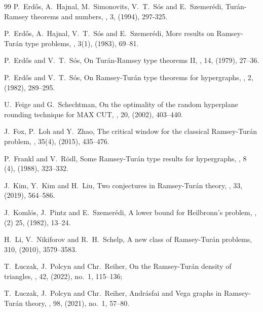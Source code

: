 \begin{thebibliography}{99}
P.~Erd\H os, A.~Hajnal, M.~Simonovits, V.~T.~S\'os and E.~Szemer\'edi,
\newblock Tur\'an-Ramsey theorems and  numbers,
, 3, (1994), 297-325.

P.~Erd\H os, A.~Hajnal, V.~T.~S\'os and E.~Szemer\'edi,
\newblock More results on Ramsey-Tur\'an type problems,
, 3(1), (1983), 69--81.

P.~Erd\H os and V.~T.~S\'os,
\newblock On Tur\'an-Ramsey type theorems II,
, 14, (1979), 27--36.

P.~Erd\H os and V.~T.~S\'os,
\newblock On Ramsey-Tur\'an type theorems for hypergraphs,
, 2, (1982), 289--295.

U.~Feige and G.~Schechtman,
\newblock On the optimality of the random hyperplane rounding technique for MAX CUT,
, 20, (2002), 403--440.

J.~Fox, P.~Loh and Y.~Zhao,
\newblock The critical window for the classical {R}amsey-{T}ur\'{a}n problem,
, 35(4), (2015), 435--476.

P.~Frankl and V.~R\"odl,
\newblock Some Ramsey-Tur\'an type results for hypergraphs,
, 8 (4), (1988), 323--332.

J.~Kim, Y.~Kim and H.~Liu,
\newblock Two conjectures in Ramsey-Tur\'an theory,
, 33, (2019), 564--586.

J.~Koml\'os, J.~Pintz and E.~Szemer\'edi,
\newblock A lower bound for Heilbronn's problem,
, (2) 25, (1982), 13--24.

H.~Li, V.~Nikiforov and R.~H.~Schelp,
\newblock A new class of Ramsey-Tur\'an problems,
 310, (2010), 3579--3583.

T.~{\L}uczak, J.~Polcyn and Chr.~Reiher,
\newblock On the Ramsey-Tur\'an density of triangles,
, 42, (2022), no.~1, 115--136;



T.~{\L}uczak, J.~Polcyn and Chr.~Reiher,
\newblock Andr\'asfai and Vega graphs in Ramsey-Tur\'an theory,
, 98, (2021), no.~1, 57--80.


\end{thebibliography}
